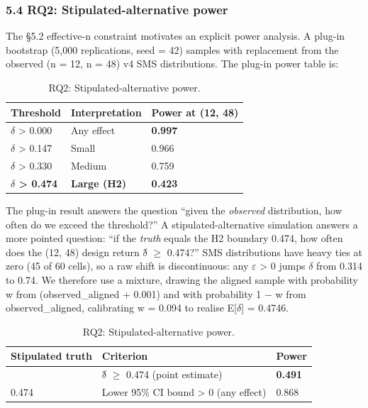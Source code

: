 \documentclass[review,12pt,authoryear]{elsarticle}
\begin{document}
\subsubsection{5.4 RQ2: Stipulated-alternative power}\label{rq2-stipulated-alternative-power}

The §5.2 effective-n constraint motivates an explicit power analysis. A
plug-in bootstrap (5,000 replications, seed = 42) samples with
replacement from the observed (n = 12, n = 48) v4 SMS distributions. The
plug-in power table is:

{\def\LTcaptype{table} %
\begin{longtable}[]{@{}lll@{}}
\caption{RQ2: Stipulated-alternative power.}\label{tab:p2-10}\\
\toprule\noalign{}
Threshold & Interpretation & Power at (12, 48) \\
\midrule\noalign{}
\endhead
\bottomrule\noalign{}
\endlastfoot
$\delta$ \textgreater{} 0.000 & Any effect & \textbf{0.997} \\
$\delta$ \textgreater{} 0.147 & Small & 0.966 \\
$\delta$ \textgreater{} 0.330 & Medium & 0.759 \\
\textbf{$\delta$ \textgreater{} 0.474} & \textbf{Large (H2)} &
\textbf{0.423} \\
\end{longtable}
}

The plug-in result answers the question ``given the \emph{observed}
distribution, how often do we exceed the threshold?'' A
stipulated-alternative simulation answers a more pointed question: ``if
the \emph{truth} equals the H2 boundary 0.474, how often does the (12,
48) design return $\delta$̂ $\geq$ 0.474?'' SMS distributions have heavy ties at zero
(45 of 60 cells), so a raw shift is discontinuous: any $\varepsilon$ \textgreater{}
0 jumps $\delta$ from 0.314 to 0.74. We therefore use a mixture, drawing the
aligned sample with probability w from (observed\_aligned + 0.001) and
with probability 1 − w from observed\_aligned, calibrating w = 0.094 to
realise E{[}$\delta${]} = 0.4746.

{\def\LTcaptype{table} %
\begin{longtable}[]{@{}lll@{}}
\caption{RQ2: Stipulated-alternative power.}\label{tab:p2-11}\\
\toprule\noalign{}
Stipulated truth & Criterion & Power \\
\midrule\noalign{}
\endhead
\bottomrule\noalign{}
\endlastfoot
0.474 & $\delta$̂ $\geq$ 0.474 (point estimate) & \textbf{0.491} \\
0.474 & Lower 95\% CI bound \textgreater{} 0 (any effect) & 0.868 \\
\end{longtable}
}
\end{document}
